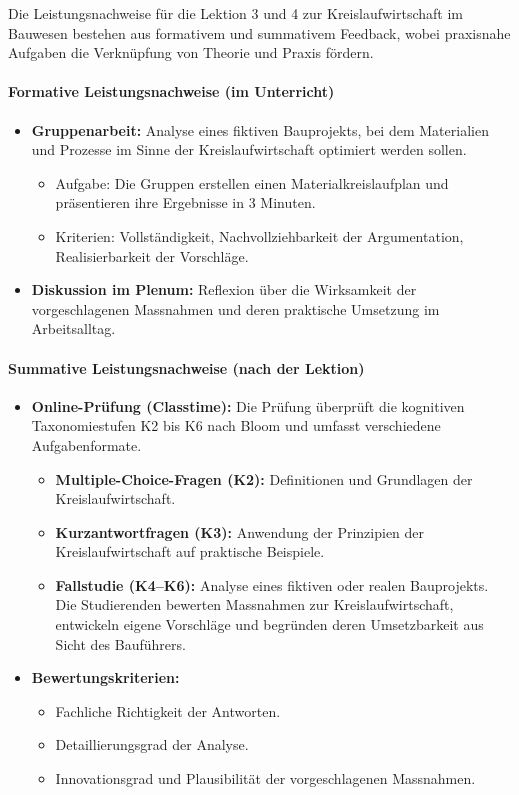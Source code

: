 \documentclass[
11pt,
captions=tableheading,
smallheadings,
headsepline,
footsepline, 
captions=tableheading,
parskip=half-,
]{scrartcl}
\begin{document}
Die Leistungsnachweise für die Lektion 3 und 4 zur Kreislaufwirtschaft im Bauwesen bestehen aus formativem und summativem Feedback, wobei praxisnahe Aufgaben die Verknüpfung von Theorie und Praxis fördern.

\paragraph{Formative Leistungsnachweise (im Unterricht)}  
\begin{itemize}
    \item \textbf{Gruppenarbeit:}  
    Analyse eines fiktiven Bauprojekts, bei dem Materialien und Prozesse im Sinne der Kreislaufwirtschaft optimiert werden sollen.  
    \begin{itemize}
        \item Aufgabe: Die Gruppen erstellen einen Materialkreislaufplan und präsentieren ihre Ergebnisse in 3 Minuten.  
        \item Kriterien: Vollständigkeit, Nachvollziehbarkeit der Argumentation, Realisierbarkeit der Vorschläge.  
    \end{itemize}
    \item \textbf{Diskussion im Plenum:}  
    Reflexion über die Wirksamkeit der vorgeschlagenen Massnahmen und deren praktische Umsetzung im Arbeitsalltag.  
\end{itemize}

\paragraph{Summative Leistungsnachweise (nach der Lektion)}  
\begin{itemize}
    \item \textbf{Online-Prüfung (Classtime):}  
    Die Prüfung überprüft die kognitiven Taxonomiestufen K2 bis K6 nach Bloom und umfasst verschiedene Aufgabenformate.  
    \begin{itemize}
        \item \textbf{Multiple-Choice-Fragen (K2):}  
        Definitionen und Grundlagen der Kreislaufwirtschaft.
        \item \textbf{Kurzantwortfragen (K3):}  
        Anwendung der Prinzipien der Kreislaufwirtschaft auf praktische Beispiele.  
        \item \textbf{Fallstudie (K4–K6):}  
        Analyse eines fiktiven oder realen Bauprojekts. Die Studierenden bewerten Massnahmen zur Kreislaufwirtschaft, entwickeln eigene Vorschläge und begründen deren Umsetzbarkeit aus Sicht des Bauführers.  
    \end{itemize}
    \item \textbf{Bewertungskriterien:}  
    \begin{itemize}
        \item Fachliche Richtigkeit der Antworten.  
        \item Detaillierungsgrad der Analyse.  
        \item Innovationsgrad und Plausibilität der vorgeschlagenen Massnahmen.  
    \end{itemize}
\end{itemize}
\end{document}
